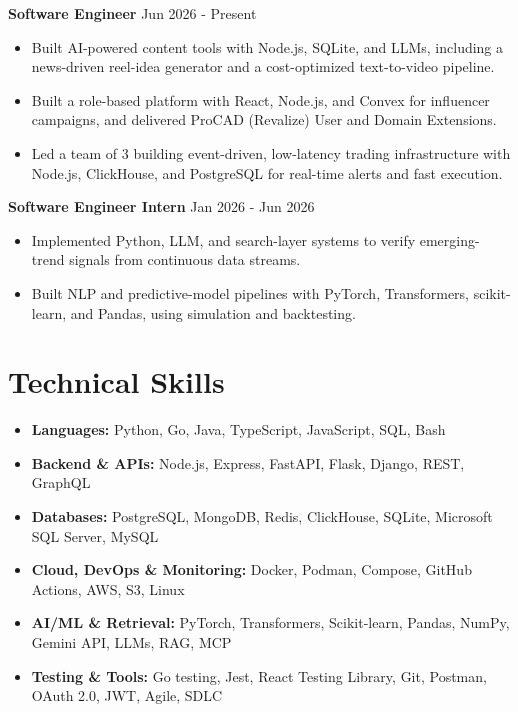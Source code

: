 \documentclass[a4paper,11pt]{article}
\newcommand{\resumeItem}[1]{\item \small{#1}}
\newcommand{\resumeSubHeadingListStart}{\begin{itemize}}
\newcommand{\resumeSubHeadingListEnd}{\end{itemize}}
\begin{document}
\textbf{Software Engineer} \hfill {Jun 2026 - Present}
\resumeSubHeadingListStart
\resumeItem{Built AI-powered content tools with Node.js, SQLite, and LLMs, including a news-driven reel-idea generator and a cost-optimized text-to-video pipeline.}
\resumeItem{Built a role-based platform with React, Node.js, and Convex for influencer campaigns, and delivered ProCAD (Revalize) User and Domain Extensions.}
\resumeItem{Led a team of 3 building event-driven, low-latency trading infrastructure with Node.js, ClickHouse, and PostgreSQL for real-time alerts and fast execution.}
\resumeSubHeadingListEnd

\textbf{Software Engineer Intern} \hfill {Jan 2026 - Jun 2026}
\resumeSubHeadingListStart
\resumeItem{Implemented Python, LLM, and search-layer systems to verify emerging-trend signals from continuous data streams.}
\resumeItem{Built NLP and predictive-model pipelines with PyTorch, Transformers, scikit-learn, and Pandas, using simulation and backtesting.}
\resumeSubHeadingListEnd


\section*{Technical Skills}
\begin{itemize}
\item \textbf{Languages:} Python, Go, Java, TypeScript, JavaScript, SQL, Bash
\item \textbf{Backend \& APIs:} Node.js, Express, FastAPI, Flask, Django, REST, GraphQL
\item \textbf{Databases:} PostgreSQL, MongoDB, Redis, ClickHouse, SQLite, Microsoft SQL Server, MySQL
\item \textbf{Cloud, DevOps \& Monitoring:} Docker, Podman, Compose, GitHub Actions, AWS, S3, Linux
\item \textbf{AI/ML \& Retrieval:} PyTorch, Transformers, Scikit-learn, Pandas, NumPy, Gemini API, LLMs, RAG, MCP
\item \textbf{Testing \& Tools:} Go testing, Jest, React Testing Library, Git, Postman, OAuth 2.0, JWT, Agile, SDLC
\end{itemize}
\vspace{-0.2em}


\end{document}
